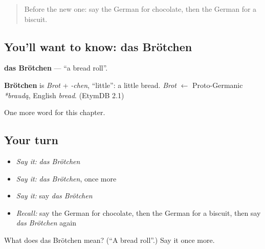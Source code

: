 \label{lesson:GE-C122-broetchen}



\begin{quote}
Before the new one: say the German for chocolate, then the German for a biscuit.
\end{quote}

\subsection*{You'll want to know: das Brötchen}
\textbf{das Brötchen} — \textquotedblleft{}a bread roll\textquotedblright{}.

\begin{cousinweb}
\textbf{Brötchen} is \emph{Brot} + \emph{-chen}, \textquotedblleft{}little\textquotedblright{}: a little bread. \emph{Brot} $\leftarrow$ Proto-Germanic \emph{*braudą}, English \emph{bread}. (EtymDB 2.1)
\end{cousinweb}

\begin{grammarlens}[title={What you've built}]
One more word for this chapter.
\end{grammarlens}

\subsection*{Your turn}
\begin{itemize}
\raggedright
  \item \emph{Say it:} \emph{das Brötchen}
  \item \emph{Say it:} \emph{das Brötchen}, once more
  \item \emph{Say it:} say \emph{das Brötchen}
  \item \emph{Recall:} say the German for chocolate, then the German for a biscuit, then say \emph{das Brötchen} again
\end{itemize}

\begin{tcolorbox}[breakable,colback=teal!4,colframe=teal!35!black,title={Before you move on}]
What does das Brötchen mean? (\textquotedblleft{}A bread roll\textquotedblright{}.) Say it once more.
\end{tcolorbox}

